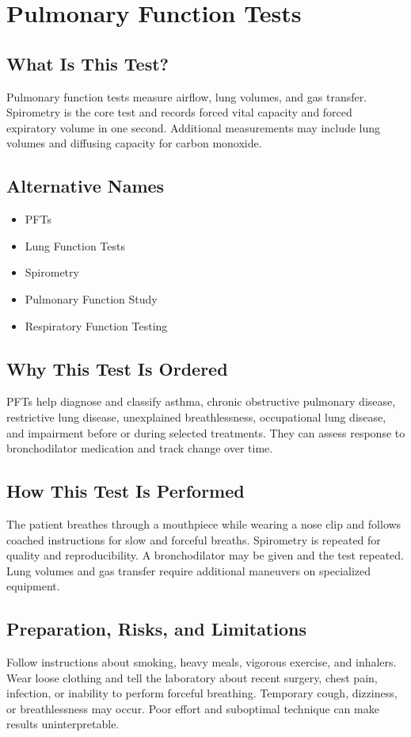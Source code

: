 \chapter{Pulmonary Function Tests}

\section*{What Is This Test?}
Pulmonary function tests measure airflow, lung volumes, and gas transfer. Spirometry is the core test and records forced vital capacity and forced expiratory volume in one second. Additional measurements may include lung volumes and diffusing capacity for carbon monoxide.

\section*{Alternative Names}
\begin{itemize}
  \item PFTs
  \item Lung Function Tests
  \item Spirometry
  \item Pulmonary Function Study
  \item Respiratory Function Testing
\end{itemize}
\section*{Why This Test Is Ordered}
PFTs help diagnose and classify asthma, chronic obstructive pulmonary disease, restrictive lung disease, unexplained breathlessness, occupational lung disease, and impairment before or during selected treatments. They can assess response to bronchodilator medication and track change over time.

\section*{How This Test Is Performed}
The patient breathes through a mouthpiece while wearing a nose clip and follows coached instructions for slow and forceful breaths. Spirometry is repeated for quality and reproducibility. A bronchodilator may be given and the test repeated. Lung volumes and gas transfer require additional maneuvers on specialized equipment.

\section*{Preparation, Risks, and Limitations}
Follow instructions about smoking, heavy meals, vigorous exercise, and inhalers. Wear loose clothing and tell the laboratory about recent surgery, chest pain, infection, or inability to perform forceful breathing. Temporary cough, dizziness, or breathlessness may occur. Poor effort and suboptimal technique can make results uninterpretable.

